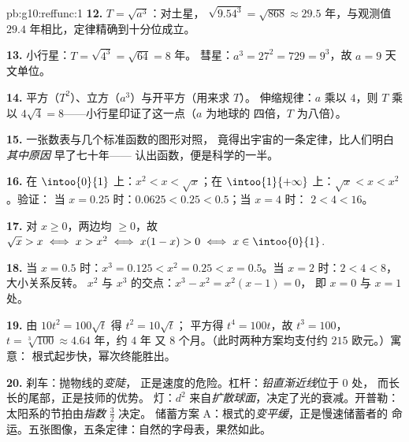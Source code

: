 \begin{solution}{pb:g10:reffunc:1}
\textbf{12.} $T = \sqrt{a^3}$：对土星，
$\sqrt{9.54^3} = \sqrt{868} \approx 29.5$ 年，与观测值
$29.4$ 年相比，定律精确到十分位成立。

\textbf{13.} 小行星：$T = \sqrt{4^3} = \sqrt{64} = 8$ 年。
彗星：$a^3 = 27^2 = 729 = 9^3$，故 $a = 9$ 天文单位。

\textbf{14.} 平方（$T^2$）、立方（$a^3$）与开平方（用来求 $T$）。
伸缩规律：$a$ 乘以 $4$，则 $T$ 乘以
$4\sqrt4 = 8$——小行星印证了这一点（$a$ 为地球的
四倍，$T$ 为八倍）。

\textbf{15.} 一张数表与几个标准函数的图形对照，
竟得出宇宙的一条定律，比人们明白\emph{其中原因}
早了七十年——
认出函数，便是科学的一半。

\textbf{16.} 在 $\intoo{0}{1}$ 上：$x^2 < x < \sqrt x$；在
$\intoo{1}{+\infty}$ 上：$\sqrt x < x < x^2$。验证：
当 $x = 0.25$ 时：$0.0625 < 0.25 < 0.5$；当 $x = 4$ 时：
$2 < 4 < 16$。

\textbf{17.} 对 $x \geq 0$，两边均 $\geq 0$，故
$\sqrt x > x \iff x > x^2 \iff x(1 - x) > 0 \iff
x \in \intoo{0}{1}$.

\textbf{18.} 当 $x = 0.5$ 时：$x^3 = 0.125 < x^2 = 0.25 < x =
0.5$。当 $x = 2$ 时：$2 < 4 < 8$，大小关系反转。
$x^2$ 与 $x^3$ 的交点：$x^3 - x^2 = x^2(x - 1) = 0$，
即 $x = 0$ 与 $x = 1$ 处。

\textbf{19.} 由 $10t^2 = 100\sqrt t$ 得 $t^2 = 10\sqrt t$；
平方得 $t^4 = 100t$，故 $t^3 = 100$，
$t = \sqrt[3]{100} \approx 4.64$ 年，约 $4$ 年
又 $8$ 个月。（此时两种方案均支付约 $215$ 欧元。）寓意：
根式起步快，幂次终能胜出。

\textbf{20.} 刹车：抛物线的\emph{变陡}，
正是速度的危险。杠杆：\emph{铅直渐近线}位于 $0$ 处，
而长长的尾部，正是技师的优势。
灯：$d^2$ 来自\emph{扩散球面}，决定了光的衰减。开普勒：
太阳系的节拍由\emph{指数} $\frac32$ 决定。
储蓄方案 A：根式的\emph{变平缓}，正是慢速储蓄者的
命运。五张图像，五条定律：自然的字母表，果然如此。
\end{solution}
